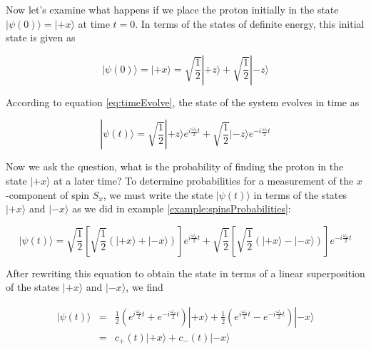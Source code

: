 Now let's examine what happens if we place the proton initially in the state $|\mbox{$\psi(0)$}\rangle = |\mbox{$+x$}\rangle$ at time $t = 0$.  In terms of the states of definite energy, this initial state is given as

\begin{equation}
|\mbox{$\psi(0)$}\rangle = |\mbox{$+x$}\rangle = \sqrt{\frac{1}{2}} |\mbox{$+z$}\rangle + \sqrt{\frac{1}{2}} |\mbox{$-z$}\rangle
\end{equation}

According to equation \ref{eq:timeEvolve}, the state of the system evolves in time as

\begin{equation}
\label{eq:plusxTime}
|\mbox{$\psi(t)$}\rangle = \sqrt{\frac{1}{2}} |\mbox{$+z$}\rangle e^{i\frac{\omega_o}{2}t} + \sqrt{\frac{1}{2}} |\mbox{$-z$}\rangle e^{-i\frac{\omega_o}{2}t}
\end{equation}


Now we ask the question, what is the probability of finding the proton in the state $|\mbox{$+x$}\rangle$ at a later time?  To determine probabilities for a measurement of the $x$-component of spin $S_x$, we must write the state $|\mbox{$\psi(t)$}\rangle$ in terms of the states $|\mbox{$+x$}\rangle$ and $|\mbox{$-x$}\rangle$ as we did in example \ref{example:spinsProbabilities}:

\begin{equation}
|\mbox{$\psi(t)$}\rangle = \sqrt{\frac{1}{2}} \left[ \sqrt{\frac{1}{2}} \left( |\mbox{$+x$}\rangle + |\mbox{$-x$}\rangle \right) \right]  e^{i\frac{\omega_o}{2}t} + \sqrt{\frac{1}{2}} \left[ \sqrt{\frac{1}{2}} \left( |\mbox{$+x$}\rangle - |\mbox{$-x$}\rangle \right) \right] e^{-i\frac{\omega_o}{2}t}
\end{equation}

After rewriting this equation to obtain the state in terms of a linear superposition of the states $|\mbox{$+x$}\rangle$ and $|\mbox{$-x$}\rangle$, we find

\begin{eqnarray}
|\mbox{$\psi(t)$}\rangle & = & \frac{1}{2} \left( e^{i\frac{\omega_o}{2}t} + e^{-i\frac{\omega_o}{2}t} \right) |\mbox{$+x$}\rangle + \frac{1}{2} \left( e^{i\frac{\omega_o}{2}t} - e^{-i\frac{\omega_o}{2}t} \right) |\mbox{$-x$}\rangle \nonumber \\
                         & = & c_+(t)|\mbox{$+x$}\rangle + c_-(t)|\mbox{$-x$}\rangle
\label{eq:timedependentstate}
\end{eqnarray}

